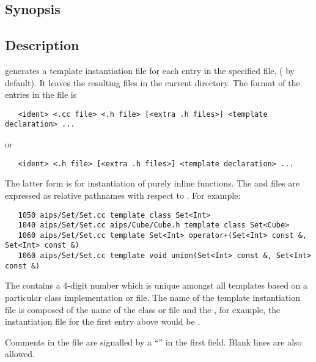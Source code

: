 \subsection*{Synopsis}
 
\begin{synopsis}
\end{synopsis}
 
\subsection*{Description}
 
 generates a template instantiation file for each entry in the
specified file, ( by default).  It leaves the resulting
 files in the current directory.  The format of the entries in the
 file is

\begin{verbatim}
   <ident> <.cc file> <.h file> [<extra .h files>] <template declaration> ...
\end{verbatim}

\noindent
or

\begin{verbatim}
   <ident> <.h file> [<extra .h files>] <template declaration> ...
\end{verbatim}

\noindent
The latter form is for instantiation of purely inline functions.  The
 and  files are expressed as relative pathnames with
respect to .  For example:

\begin{verbatim}
   1050 aips/Set/Set.cc template class Set<Int>
   1040 aips/Set/Set.cc aips/Cube/Cube.h template class Set<Cube>
   1060 aips/Set/Set.cc template Set<Int> operator+(Set<Int> const &, Set<Int> const &)
   1060 aips/Set/Set.cc template void union(Set<Int> const &, Set<Int> const &)
\end{verbatim}

\noindent
The  contains a 4-digit number which is unique amongst all
templates based on a particular class implementation  or 
file.  The name of the template instantiation  file is composed of
the name of the class  or  file and the , for
example, the instantiation file for the first entry above would be
.

\noindent
Comments in the  file are signalled by a ``\code{\#}'' in the
first field.  Blank lines are also allowed.

